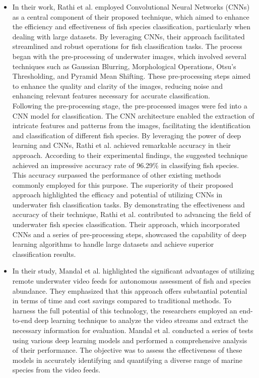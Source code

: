 \begin{itemize}
    \item In their work, Rathi et al. \cite{rathi2017underwater} employed Convolutional Neural Networks (CNNs) as a central component of their proposed technique, which aimed to enhance the efficiency and effectiveness of fish species classification, particularly when dealing with large datasets. By leveraging CNNs, their approach facilitated streamlined and robust operations for fish classification tasks. The process began with the pre-processing of underwater images, which involved several techniques such as Gaussian Blurring, Morphological Operations, Otsu's Thresholding, and Pyramid Mean Shifting. These pre-processing steps aimed to enhance the quality and clarity of the images, reducing noise and enhancing relevant features necessary for accurate classification. \\ 
    Following the pre-processing stage, the pre-processed images were fed into a CNN model for classification. The CNN architecture enabled the extraction of intricate features and patterns from the images, facilitating the identification and classification of different fish species. By leveraging the power of deep learning and CNNs, Rathi et al. achieved remarkable accuracy in their approach. According to their experimental findings, the suggested technique achieved an impressive accuracy rate of 96.29\% in classifying fish species. This accuracy surpassed the performance of other existing methods commonly employed for this purpose. The superiority of their proposed approach highlighted the efficacy and potential of utilizing CNNs in underwater fish classification tasks. By demonstrating the effectiveness and accuracy of their technique, Rathi et al. contributed to advancing the field of underwater fish species classification. Their approach, which incorporated CNNs and a series of pre-processing steps, showcased the capability of deep learning algorithms to handle large datasets and achieve superior classification results.
    \item In their study, Mandal et al. \cite{mandal2018assessing} highlighted the significant advantages of utilizing remote underwater video feeds for autonomous assessment of fish and species abundance. They emphasized that this approach offers substantial potential in terms of time and cost savings compared to traditional methods. To harness the full potential of this technology, the researchers employed an end-to-end deep learning technique to analyze the video streams and extract the necessary information for evaluation. Mandal et al. conducted a series of tests using various deep learning models and performed a comprehensive analysis of their performance. The objective was to assess the effectiveness of these models in accurately identifying and quantifying a diverse range of marine species from the video feeds.\\

\end{itemize}
